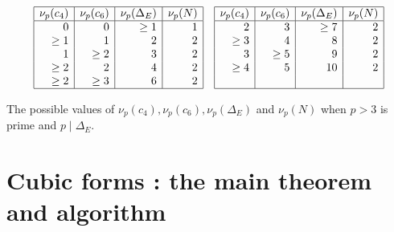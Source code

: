 \begin{table}[h]
$$
\begin{array}{|r|r|r|r|}
\hline
\nu_p (c_4) & \nu_p (c_6) & \nu_p (\Delta_E) & \nu_p (N)  \\ \hline
0 & 0 & \geq 1  & 1  \\
\geq 1 & 1 & 2 & 2  \\
1 & \geq 2 & 3 & 2  \\
\geq 2 & 2 & 4 & 2  \\
\geq 2 & \geq 3 & 6 & 2 \\
\hline
\end{array}
\quad
\begin{array}{|r|r|r|r|}
\hline
\nu_p (c_4) & \nu_p (c_6) & \nu_p (\Delta_E) & \nu_p (N)  \\ \hline
 2 & 3 & \geq 7 & 2 \\
 \geq 3 & 4 & 8 & 2 \\
 3 & \geq 5 & 9 & 2 \\
 \geq 4 & 5 & 10 & 2 \\
  &  &  &  \\
\hline
\end{array}
$$

\caption{The possible values of $\nu_p(c_4), \nu_p(c_6), \nu_p(\Delta_E)$ and $\nu_p(N)$ when $p > 3$ is prime and 
$p\mid \Delta_E$.}
\label{tab nup}
\end{table}


\section{Cubic forms : the main theorem and algorithm} \label{forms}

